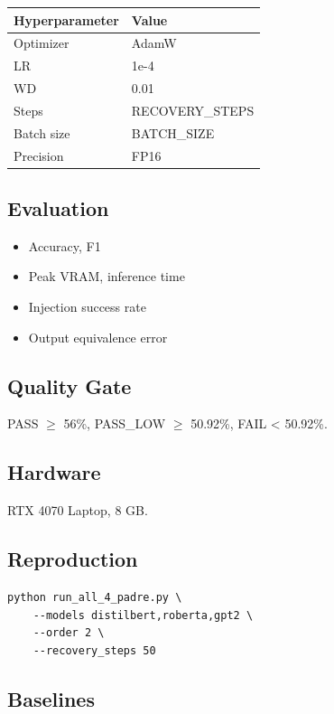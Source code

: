 \begin{table}[H]
\centering
\small
\begin{tabular}{ll}
\toprule
\textbf{Hyperparameter} & \textbf{Value} \\
\midrule
Optimizer & AdamW \\
LR & 1e-4 \\
WD & 0.01 \\
Steps & {{RECOVERY\_STEPS}} \\
Batch size & {{BATCH\_SIZE}} \\
Precision & FP16 \\
\bottomrule
\end{tabular}
\end{table}

\subsection{Evaluation}

\begin{itemize}
\item Accuracy, F1
\item Peak VRAM, inference time
\item Injection success rate
\item Output equivalence error

\end{itemize}
\subsection{Quality Gate}

PASS $\ge$ 56\%, PASS\_LOW $\ge$ 50.92\%, FAIL < 50.92\%.

\subsection{Hardware}

RTX 4070 Laptop, 8 GB.

\subsection{Reproduction}

\begin{lstlisting}
python run_all_4_padre.py \
    --models distilbert,roberta,gpt2 \
    --order 2 \
    --recovery_steps 50
\end{lstlisting}

\subsection{Baselines}

